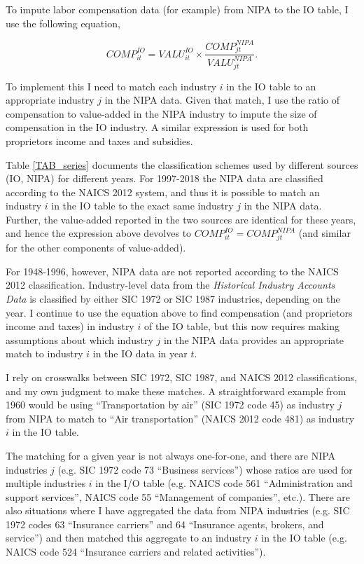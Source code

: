 \documentclass[11pt]{article}
\begin{document}
To impute labor compensation data (for example) from NIPA to the IO table, I use the following equation,

\begin{equation}
	COMP_{it}^{IO} = VALU_{it}^{IO} \times \frac{COMP_{jt}^{NIPA}}{VALU_{jt}^{NIPA}}. \label{EQ_match}
\end{equation}

To implement this I need to match each industry $i$ in the IO table to an appropriate industry $j$ in the NIPA data. Given that match, I use the ratio of compensation to value-added in the NIPA industry to impute the size of compensation in the IO industry. A similar expression is used for both proprietors income and taxes and subsidies. 

Table \ref{TAB_series} documents the classification schemes used by different sources (IO, NIPA) for different years. For 1997-2018 the NIPA data \citep{beasection6} are classified according to the NAICS 2012 system, and thus it is possible to match an industry $i$ in the IO table to the exact same industry $j$ in the NIPA data. Further, the value-added reported in the two sources are identical for these years, and hence the expression above devolves to $COMP_{it}^{IO} = COMP_{jt}^{NIPA}$ (and similar for the other components of value-added). 

For 1948-1996, however, NIPA data are not reported according to the NAICS 2012 classification. Industry-level data from the \textit{Historical Industry Accounts Data} \citep{beahistind} is classified by either SIC 1972 or SIC 1987 industries, depending on the year. I continue to use the equation above to find compensation (and proprietors income and taxes) in industry $i$ of the IO table, but this now requires making assumptions about which industry $j$ in the NIPA data provides an appropriate match to industry $i$ in the IO data in year $t$.

I rely on crosswalks between SIC 1972, SIC 1987, and NAICS 2012 classifications, and my own judgment to make these matches. A straightforward example from 1960 would be using ``Transportation by air'' (SIC 1972 code 45) as industry $j$ from NIPA to match to ``Air transportation'' (NAICS 2012 code 481) as industry $i$ in the IO table.

The matching for a given year is not always one-for-one, and there are NIPA industries $j$ (e.g. SIC 1972 code 73 ``Business services'') whose ratios are used for multiple industries $i$ in the I/O table (e.g. NAICS code 561 ``Administration and support services'', NAICS code 55 ``Management of companies'', etc.). There are also situations where I have aggregated the data from NIPA industries (e.g. SIC 1972 codes 63 ``Insurance carriers'' and 64 ``Insurance agents, brokers, and service'') and then matched this aggregate to an industry $i$ in the IO table (e.g. NAICS code 524 ``Insurance carriers and related activities''). 
\end{document}
